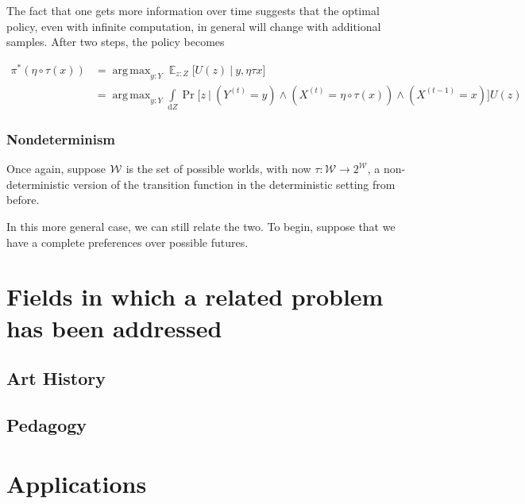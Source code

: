 \documentclass{book}
\DeclareMathOperator*{\argmax}{arg\,max}
\DeclareMathOperator*{\E}{\mathbb E}
\begin{document}
	The fact that one gets more information over time suggests that the optimal policy, even with infinite computation, in general will change with additional samples. After two steps, the policy becomes
	
	\begin{align*}
		\pi^*(\eta\circ\tau (x)) &= \argmax_{y: Y} \E_{z : Z} \Big[ U(z)~\Big|~ y,\eta\tau x \Big]  \\
			&= \argmax_{y: Y} \int\limits_{\mathrm dZ} \Pr\Big[z~\Big|~\left(Y^{(t)} = y \right) \land \left(X^{(t)}= \eta \circ \tau (x)\right) \land \left(X^{(t-1)} = x \right) \Big] U(z)
	\end{align*}
		
	
	\subsubsection{Nondeterminism}
	Once again, suppose $\cal W$ is the set of possible worlds, with now $\tau: \mathcal W \to 2^{\mathcal W}$, a non-deterministic version of the transition function in the deterministic setting from before.
	
	In this more general case, we can still relate the two. To begin, suppose that we have a complete preferences over possible futures. 
	
	
	\section{Fields in which a related problem has been addressed}
	
	\subsection{Art History} %
	\subsection{Pedagogy} %
	\subsection{}
	
	
	\section{Applications}
	
\end{document}
